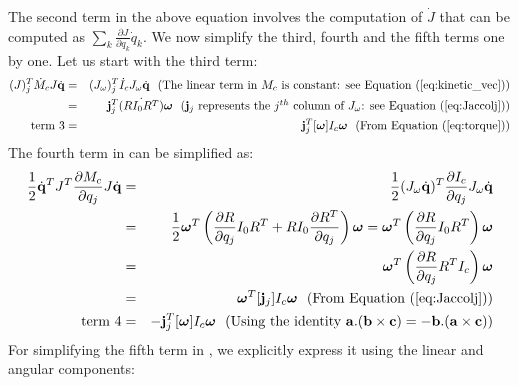 The second term in the above equation involves the computation of $\dot{J}$ that can be computed as $\sum_k \frac{\partial J}{\partial q_k} \dot{q}_k$. We now simplify the third, fourth and the fifth terms one by one. Let us start with the third term:
\begin{eqnarray}
\label{eq:term3}
\nonumber
(J)_j^T \dot{M}_c J \dot{\vc{q}} & = & (J_\omega)_j^T \dot{I}_c J_\omega \dot{\vc{q}} \mbox{\ \ (The linear term in $M_c$ is constant: see \eqnref{kinetic_vec})}\\
\nonumber
& = & \vc{j}_j^T\dot{(RI_0 R^T)}\bm{\omega} \mbox{\ \ ($\vc{j}_j$ represents the $j^{th}$ column of $J_\omega$: see \eqnref{Jaccolj})} \\
\mbox{term 3} & = & \vc{j}_j^T[\bm{\omega}]I_c \bm{\omega}  \mbox{\ \ (From \eqnref{torque})}
\end{eqnarray}
The fourth term in  can be simplified as:
\begin{eqnarray}
\label{eq:term4}
\nonumber
\frac{1}{2}\dot{\vc{q}}^T J^T \frac{\partial M_c}{\partial q_j} J \dot{\vc{q}} & = & \frac{1}{2} (J_\omega \dot{\vc{q}})^T \frac{\partial I_c}{\partial q_j} J_\omega \dot{\vc{q}}\\
\nonumber
& = & \frac{1}{2} \bm{\omega}^T \left ( \frac{\partial R}{\partial q_j}I_0R^T + RI_0\frac{\partial R^T}{\partial q_j} \right )  \bm{\omega} = \bm{\omega}^T \left ( \frac{\partial R}{\partial q_j}I_0R^T \right ) \bm{\omega} \\
\nonumber
& = & \bm{\omega}^T \left ( \frac{\partial R}{\partial q_j}R^T I_c \right ) \bm{\omega}\\
\nonumber
 & = & \bm{\omega}^T [\vc{j}_j] I_c \bm{\omega} \mbox{\ \ (From \eqnref{Jaccolj})}\\
\mbox{term 4}  & = & - \vc{j}_j^T[\bm{\omega}]I_c \bm{\omega} \mbox{\ \ (Using the identity $\vc{a}.(\vc{b}\times\vc{c}) = -\vc{b}.(\vc{a}\times\vc{c}))$}
\end{eqnarray}
For simplifying the fifth term in , we explicitly express it using the linear and angular components:
